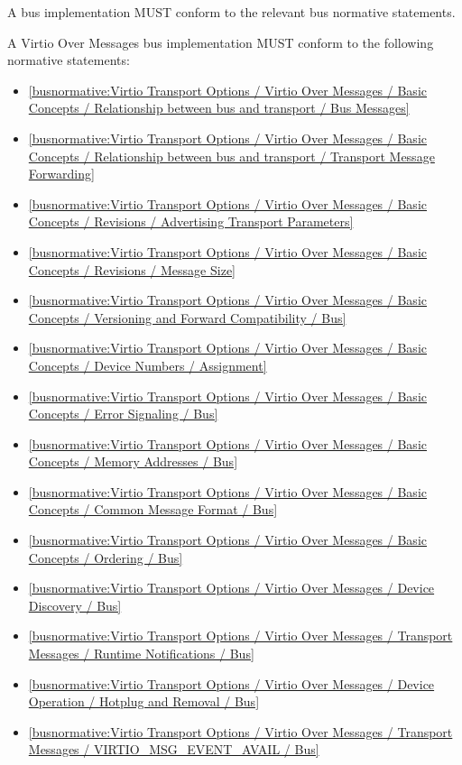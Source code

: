 \label{sec:Conformance / Bus Conformance}

A bus implementation MUST conform to the relevant bus normative statements.

\label{sec:Conformance / Bus Conformance / Virtio Over Messages Bus Conformance}

A Virtio Over Messages bus implementation MUST conform to the following normative statements:

\begin{itemize}
\item \ref{busnormative:Virtio Transport Options / Virtio Over Messages / Basic Concepts / Relationship between bus and transport / Bus Messages}
\item \ref{busnormative:Virtio Transport Options / Virtio Over Messages / Basic Concepts / Relationship between bus and transport / Transport Message Forwarding}
\item \ref{busnormative:Virtio Transport Options / Virtio Over Messages / Basic Concepts / Revisions / Advertising Transport Parameters}
\item \ref{busnormative:Virtio Transport Options / Virtio Over Messages / Basic Concepts / Revisions / Message Size}
\item \ref{busnormative:Virtio Transport Options / Virtio Over Messages / Basic Concepts / Versioning and Forward Compatibility / Bus}
\item \ref{busnormative:Virtio Transport Options / Virtio Over Messages / Basic Concepts / Device Numbers / Assignment}
\item \ref{busnormative:Virtio Transport Options / Virtio Over Messages / Basic Concepts / Error Signaling / Bus}
\item \ref{busnormative:Virtio Transport Options / Virtio Over Messages / Basic Concepts / Memory Addresses / Bus}
\item \ref{busnormative:Virtio Transport Options / Virtio Over Messages / Basic Concepts / Common Message Format / Bus}
\item \ref{busnormative:Virtio Transport Options / Virtio Over Messages / Basic Concepts / Ordering / Bus}
\item \ref{busnormative:Virtio Transport Options / Virtio Over Messages / Device Discovery / Bus}
\item \ref{busnormative:Virtio Transport Options / Virtio Over Messages / Transport Messages / Runtime Notifications / Bus}
\item \ref{busnormative:Virtio Transport Options / Virtio Over Messages / Device Operation / Hotplug and Removal / Bus}
\item \ref{busnormative:Virtio Transport Options / Virtio Over Messages / Transport Messages / VIRTIO_MSG_EVENT_AVAIL / Bus}
\end{itemize}


